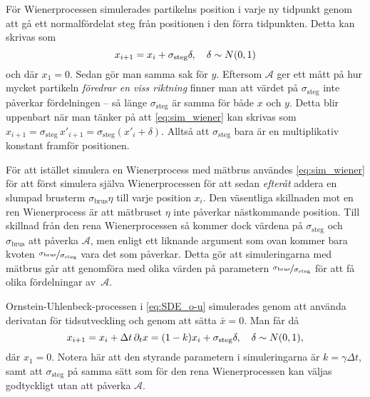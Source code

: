 För Wienerprocessen simulerades partikelns position i varje ny tidpunkt genom att gå ett normalfördelat steg från positionen i den förra tidpunkten. Detta kan skrivas som
\begin{equation}\label{eq:sim_wiener}
x_{i+1} = x_i + \sigma_\text{steg}\delta 
\qcomma  \delta \sim N(0, 1)
\end{equation}
och där $x_1=0$. Sedan gör man samma sak för $y$. Eftersom $\mathcal{A}$ ger ett mått på hur mycket partikeln \emph{föredrar en viss riktning} finner man att värdet på $\sigma_\text{steg}$ inte påverkar fördelningen -- så länge $\sigma_\text{steg}$ är samma för både $x$ och $y$. Detta blir uppenbart när man tänker på att \eqref{eq:sim_wiener} kan skrivas som 
$x_{i+1} =\sigma_\text{steg}\,x'_{i+1} = \sigma_\text{steg}\left( x'_i + \delta \right)$. 
Alltså att $\sigma_\text{steg}$ bara är en multiplikativ konstant framför positionen.

För att istället simulera en Wienerprocess med mätbrus användes \eqref{eq:sim_wiener} för att först simulera själva Wienerprocessen för att sedan \emph{efteråt} addera en slumpad brusterm $\sigma_\text{brus}\eta$ till varje position $x_i$. %
Den väsentliga skillnaden mot en ren Wienerprocess är att mätbruset $\eta$ inte påverkar nästkommande position. Till skillnad från den rena Wienerprocessen så kommer dock värdena på $\sigma_\text{steg}$ och $\sigma_\text{brus}$ att påverka $\mathcal{A}$, men enligt ett liknande argument som ovan kommer bara kvoten $\nicefrac{\sigma_\text{brus}}{\sigma_\text{steg}}$ vara det som påverkar. Detta gör att simuleringarna med mätbrus går att genomföra med olika värden på parametern $\nicefrac{\sigma_\text{brus}}{\sigma_\text{steg}}$ för att få olika fördelningar av~$\mathcal{A}$. 

Ornstein-Uhlenbeck-processen i \eqref{eq:SDE_o-u} simulerades genom att använda derivatan för tidsutveckling och genom att sätta $\bar{x}=0$. Man får då
\begin{equation}
x_{i+1} = x_i + \Delta{t}\,\pd_{t}x  = (1-k) x_i +  \sigma_\text{steg}\delta 
\qcomma  \delta \sim N(0, 1),
\end{equation}
där $x_1=0$. Notera här att den styrande parametern i simuleringarna är $k=\gamma\Delta{t}$, samt att $\sigma_\text{steg}$ på samma sätt som för den rena Wienerprocessen kan väljas godtyckligt utan att påverka $\mathcal{A}$. 

